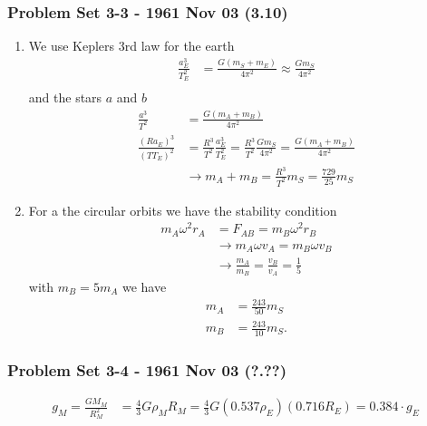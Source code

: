 \documentclass[10pt,a4paper]{article}
\theoremstyle{definition}
\begin{document}
\subsubsection{Problem Set 3-3 - 1961 Nov 03 (3.10)}
\begin{enumerate}[label=(\alph*)]
\item We use Keplers 3rd law for the earth
\begin{align}
    \frac{a_E^3}{T_E^2}&=\frac{G(m_S+m_E)}{4\pi^2}\approx\frac{Gm_S}{4\pi^2}\\
\end{align}
and the stars $a$ and $b$
\begin{align}
    \frac{a^3}{T^2}&=\frac{G(m_A+m_B)}{4\pi^2}\\
    \frac{(Ra_E)^3}{(TT_E)^2}&=\frac{R^3}{T^2}\frac{a_E^3}{T_E^2}=\frac{R^3}{T^2}\frac{Gm_S}{4\pi^2}=\frac{G(m_A+m_B)}{4\pi^2}\\
    &\rightarrow m_A+m_B = \frac{R^3}{T^2}m_S=\frac{729}{25}m_S
\end{align}

\item For a the circular orbits we have the stability condition
\begin{align}
    m_A\omega^2r_A&=F_{AB}=m_B\omega^2r_B\\
    &\rightarrow m_A\omega v_A=m_B\omega v_B\\
    &\rightarrow \frac{m_A}{m_B} =\frac{v_B}{v_A}=\frac{1}{5}
\end{align}
with $m_B=5m_A$ we have 
\begin{align}
    m_A&=\frac{243}{50}m_S\\
    m_B&=\frac{243}{10}m_S.
\end{align}
\end{enumerate}

\subsubsection{Problem Set 3-4 - 1961 Nov 03 (?.??)}
\begin{align}
    g_M=\frac{GM_M}{R_M^2}&=\frac{4}{3}G\rho_M R_M=\frac{4}{3}G (0.537\rho_E) (0.716R_E)=0.384 \cdot g_E
\end{align}
\end{document}

